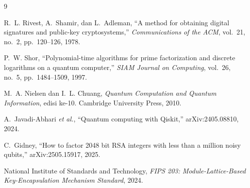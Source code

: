 \documentclass[11pt,a4paper]{article}
\begin{document}
\begin{thebibliography}{9}

R.~L. Rivest, A.~Shamir, dan L.~Adleman,
``A method for obtaining digital signatures and public-key cryptosystems,''
\emph{Communications of the ACM}, vol.~21, no.~2, pp.~120--126, 1978.

P.~W. Shor,
``Polynomial-time algorithms for prime factorization and discrete logarithms
on a quantum computer,''
\emph{SIAM Journal on Computing}, vol.~26, no.~5, pp.~1484--1509, 1997.

M.~A. Nielsen dan I.~L. Chuang,
\emph{Quantum Computation and Quantum Information}, edisi ke-10.
Cambridge University Press, 2010.

A.~Javadi-Abhari \emph{et al.},
``Quantum computing with Qiskit,'' arXiv:2405.08810, 2024.

C.~Gidney,
``How to factor 2048 bit RSA integers with less than a million noisy qubits,''
arXiv:2505.15917, 2025.

National Institute of Standards and Technology,
\emph{FIPS 203: Module-Lattice-Based Key-Encapsulation Mechanism Standard},
2024.

\end{thebibliography}
\end{document}
